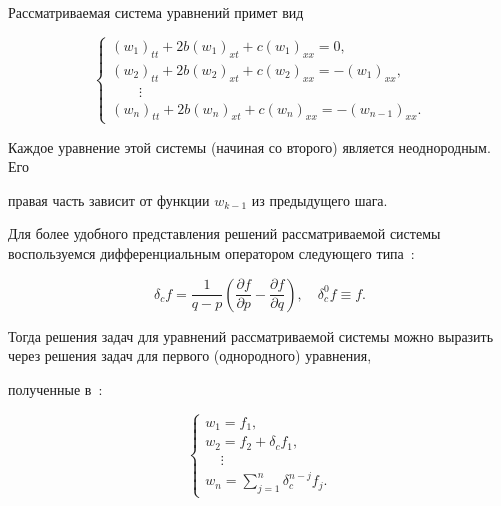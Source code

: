 Рассматриваемая система уравнений примет вид

\begin{equation}

\label{2:sys_bE}

\left\{

  \begin{array}{l}

    (w_1)_{tt}+2b(w_1)_{xt}+c(w_1)_{xx}=0, \\

    (w_2)_{tt}+2b(w_2)_{xt}+c(w_2)_{xx}=-(w_1)_{xx}, \\

    ~~~~~~~~~\vdots \\

    (w_n)_{tt}+2b(w_n)_{xt}+c(w_n)_{xx}=-(w_{n-1})_{xx}.

  \end{array}

\right.

\end{equation}

Каждое уравнение этой системы (начиная со второго) является неоднородным. Его

правая часть зависит от функции $w_{k-1}$ из предыдущего шага.



Для более удобного представления решений рассматриваемой системы воспользуемся дифференциальным оператором следующего типа~\cite{kozlova:bib:Andreev_Lexina1}:

\begin{equation*}

\delta_cf=\frac{1}{q-p}\left(\frac{\partial f}{\partial p}-\frac{\partial f}{\partial q}\right),\quad\delta_c^0f\equiv f.

\end{equation*}

Тогда решения задач для уравнений рассматриваемой системы можно выразить через решения задач для первого (однородного) уравнения,

полученные в~\cite{kozlova:bib:Kozlova1,kozlova:bib:Kozlova2}:





\begin{equation*}

\left\{

  \begin{array}{l}

    w_1={f_1}, \\

    w_2={f_2}+\delta_c {f_1}, \\

    ~~~~~\vdots \\

    w_n=\sum_{j=1}^{n}{\delta_c^{n-j}{f_{j}}}.

  \end{array}

\right.

\end{equation*}

